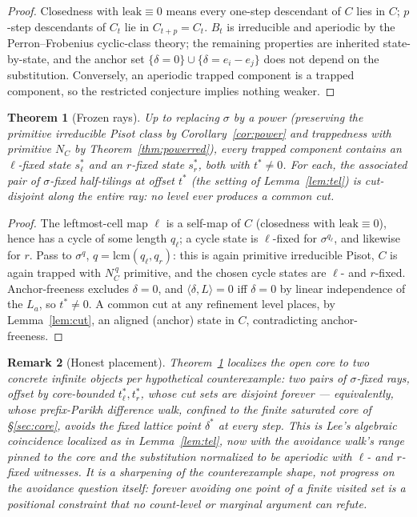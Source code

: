 \documentclass[11pt]{article}
\newtheorem{theorem}{Theorem}[section]
\newtheorem{remark}[theorem]{Remark}
\begin{document}
\begin{proof}
Closedness with $\mathrm{leak}\equiv0$ means every one-step descendant
of $C$ lies in $C$; $p$-step descendants of $C_t$ lie in
$C_{t+p}=C_t$. $B_t$ is irreducible and aperiodic by the
Perron--Frobenius cyclic-class theory; the remaining properties are
inherited state-by-state, and the anchor set
$\{\delta=0\}\cup\{\delta=e_i-e_j\}$ does not depend on the
substitution. Conversely, an aperiodic trapped component is a trapped
component, so the restricted conjecture implies nothing weaker.
\end{proof}

\begin{theorem}[Frozen rays]\label{thm:frozen}
Up to replacing $\sigma$ by a power (preserving the primitive irreducible
Pisot class by Corollary~\ref{cor:power} and trappedness with primitive
$N_C$ by Theorem~\ref{thm:powerred}), every trapped component contains
an $\ell$-fixed state $s^{*}_{\ell}$ and an $r$-fixed state
$s^{*}_{r}$, both with $t^{*}\ne0$. For each, the associated pair of
$\sigma$-fixed half-tilings at offset $t^{*}$ (the setting of
Lemma~\ref{lem:tel}) is cut-disjoint along the \emph{entire} ray:
no level ever produces a common cut.
\end{theorem}

\begin{proof}
The leftmost-cell map $\ell$ is a self-map of $C$ (closedness with
$\mathrm{leak}\equiv0$), hence has a cycle of some length $q_\ell$; a
cycle state is $\ell$-fixed for $\sigma^{q_\ell}$, and likewise for
$r$. Pass to $\sigma^{q}$, $q=\mathrm{lcm}(q_\ell,q_r)$: this is again
primitive irreducible Pisot, $C$ is again trapped with
$N_C^{\,q}$ primitive, and the chosen cycle states are $\ell$- and
$r$-fixed. Anchor-freeness excludes $\delta=0$, and
$\langle\delta,L\rangle=0$ iff $\delta=0$ by linear independence of the
$L_a$, so $t^{*}\ne0$. A common cut at any refinement level places, by
Lemma~\ref{lem:cut}, an aligned (anchor) state in $C$, contradicting
anchor-freeness.
\end{proof}

\begin{remark}[Honest placement]\label{rem:frozenplacement}
Theorem~\ref{thm:frozen} localizes the open core to two concrete
infinite objects per hypothetical counterexample: two pairs of
$\sigma$-fixed rays, offset by core-bounded $t^{*}_{\ell},t^{*}_{r}$,
whose cut sets are disjoint forever --- equivalently, whose
prefix-Parikh difference walk, confined to the finite saturated core of
\S\ref{sec:core}, avoids the fixed lattice point $\delta^{*}$ at every
step. This is Lee's algebraic coincidence localized as in
Lemma~\ref{lem:tel}, now with the avoidance walk's range pinned
to the core and the substitution normalized to be aperiodic with
$\ell$- and $r$-fixed witnesses. It is a sharpening of the
counterexample shape, not progress on the avoidance question itself:
forever avoiding one point of a finite visited set is a positional
constraint that no count-level or marginal argument can refute.
\end{remark}
\end{document}
